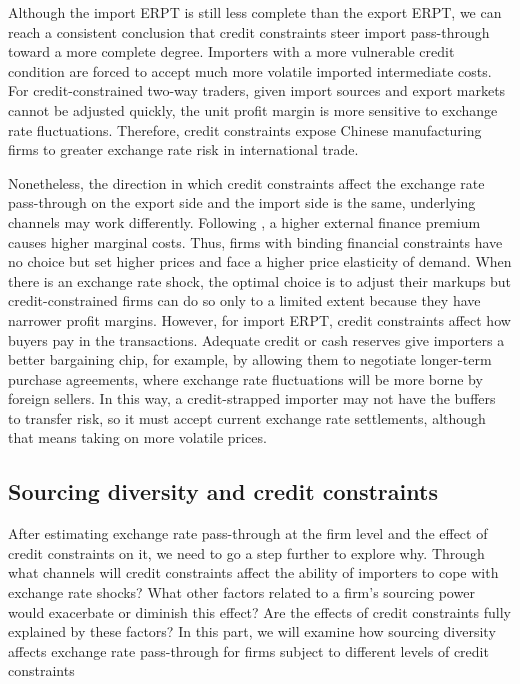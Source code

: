 \documentclass[12pt]{article}
\begin{document}
Although the import ERPT is still less complete than the export ERPT, we can reach a consistent conclusion that credit constraints steer import pass-through toward a more complete degree.  Importers with a more vulnerable credit condition are forced to accept much more volatile imported intermediate costs. For credit-constrained two-way traders, given import sources and export markets cannot be adjusted quickly, the unit profit margin is more sensitive to exchange rate fluctuations. Therefore, credit constraints expose Chinese manufacturing firms to greater exchange rate risk in international trade.

Nonetheless, the direction in which credit constraints affect the exchange rate pass-through on the export side and the import side is the same, underlying channels may work differently. Following \cite{strasser2013}, a higher external finance premium causes higher marginal costs. Thus, firms with binding financial constraints have no choice but set higher prices and face a higher price elasticity of demand. When there is an exchange rate shock, the optimal choice is to adjust their markups but credit-constrained firms can do so only to a limited extent because they have narrower profit margins. However, for import ERPT, credit constraints affect how buyers pay in the transactions. Adequate credit or cash reserves give importers a better bargaining chip, for example, by allowing them to negotiate longer-term purchase agreements, where exchange rate fluctuations will be more borne by foreign sellers. In this way, a credit-strapped importer may not have the buffers to transfer risk, so it must accept current exchange rate settlements, although that means taking on more volatile prices.

\subsection{Sourcing diversity and credit constraints}

After estimating exchange rate pass-through at the firm level and the effect of credit constraints on it, we need to go a step further to explore why. Through what channels will credit constraints affect the ability of importers to cope with exchange rate shocks? What other factors related to a firm's sourcing power would exacerbate or diminish this effect? Are the effects of credit constraints fully explained by these factors? In this part, we will examine how sourcing diversity affects exchange rate pass-through for firms subject to different levels of credit constraints
\end{document}
